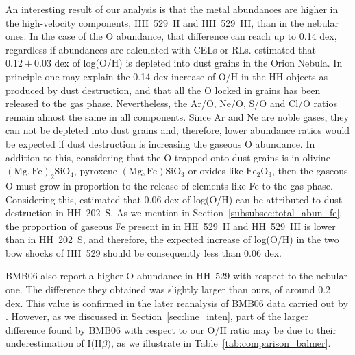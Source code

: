 \documentclass[fleqn,usenatbib]{mnras}
\begin{document}
An interesting result of our analysis is that the metal abundances are higher in the high-velocity components, HH~529~II and HH~529~III, than in the nebular ones. In the case of the O abundance, that difference can reach up to 0.14 dex, regardless if abundances are calculated with CELs or RLs. \citet{mesadelgado09} estimated that $0.12 \pm 0.03$ dex of log(O/H) is depleted into dust grains in the Orion Nebula. In principle one may explain the 0.14 dex increase of O/H in the HH objects as produced by dust destruction, and that all the O locked in grains has been released to the gas phase.  Nevertheless, the Ar/O, Ne/O, S/O and Cl/O ratios remain almost the same in all components. Since Ar and Ne are noble gases, they can not be depleted into dust grains and, therefore, lower abundance ratios would be expected if dust destruction is increasing the gaseous O abundance.  
In addition to this, considering that the O trapped onto dust grains is in olivine $(\text{Mg},\text{Fe})_2\text{SiO}_4$, pyroxene $(\text{Mg},\text{Fe})\text{SiO}_3$ or oxides like $\text{Fe}_2\text{O}_3$, then the gaseous O must grow in proportion to the release of elements like Fe to the gas phase. Considering this, \citet{mesadelgado09} estimated that 0.06 dex of log(O/H) can be attributed to dust destruction in HH~202~S. As we mention in Section~\ref{subsubsec:total_abun_fe}, the proportion of gaseous Fe present in in HH~529~II and HH~529~III is lower than in HH~202~S, and therefore, the expected increase of log(O/H) in the two bow shocks of HH~529 should be consequently less than 0.06 dex.  

BMB06 also report a higher O abundance in HH~529 with respect to the nebular one. The difference they obtained was slightly larger than ours, of around 0.2 dex. This value is confirmed in the later reanalysis of BMB06 data carried out by \citet{simondiaz2011}. However, as we discussed in Section~\ref{sec:line_inten}, part of the larger difference found by BMB06 with respect to our O/H ratio may be due to their underestimation of $\text{I(H}\beta\text{)}$, as we illustrate in Table~\ref{tab:comparison_balmer}.
\end{document}
